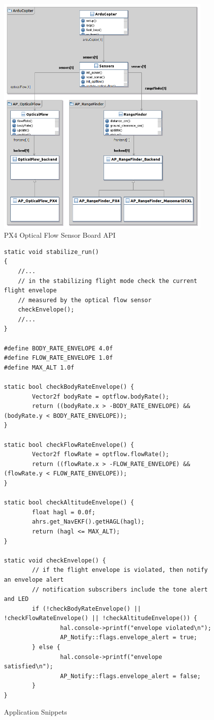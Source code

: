 \begin{figure}[h]
	\centering
    \includegraphics[width=400px]{graphics/OpticalFlowDiagram.png}
	\caption{PX4 Optical Flow Sensor Board \ac{API}}
	\label{fig:of_sensor_board_api}
\end{figure}

\begin{figure}[h]
	\begin{lstlisting}[basicstyle=\scriptsize]
static void stabilize_run()
{
    //...
    // in the stabilizing flight mode check the current flight envelope
    // measured by the optical flow sensor
    checkEnvelope();
    //...
}

#define BODY_RATE_ENVELOPE 4.0f
#define FLOW_RATE_ENVELOPE 1.0f
#define MAX_ALT 1.0f

static bool checkBodyRateEnvelope() {
        Vector2f bodyRate = optflow.bodyRate();
        return ((bodyRate.x > -BODY_RATE_ENVELOPE) && (bodyRate.y < BODY_RATE_ENVELOPE));
}

static bool checkFlowRateEnvelope() {
        Vector2f flowRate = optflow.flowRate();
        return ((flowRate.x > -FLOW_RATE_ENVELOPE) && (flowRate.y < FLOW_RATE_ENVELOPE));
}

static bool checkAltitudeEnvelope() {
        float hagl = 0.0f;
        ahrs.get_NavEKF().getHAGL(hagl);
        return (hagl <= MAX_ALT);
}

static void checkEnvelope() {
        // if the flight envelope is violated, then notify an envelope alert
        // notification subscribers include the tone alert and LED
        if (!checkBodyRateEnvelope() || !checkFlowRateEnvelope() || !checkAltitudeEnvelope()) {
                hal.console->printf("envelope violated\n");
                AP_Notify::flags.envelope_alert = true;
        } else {
                hal.console->printf("envelope satisfied\n");
                AP_Notify::flags.envelope_alert = false;
        }
}
	\end{lstlisting}
	\caption{Application Snippets}
	\label{fig:application_snippets}
\end{figure}

